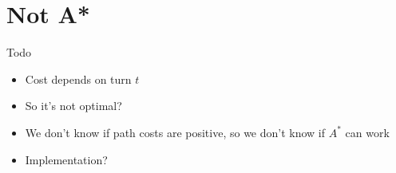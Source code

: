 \section{Not A*}

Todo
\begin{itemize}
\item Cost depends on turn $t$
\item So it's not optimal?
\item We don't know if path costs are positive, so we don't know if $A^*$ can work
\item Implementation?
\end{itemize}

